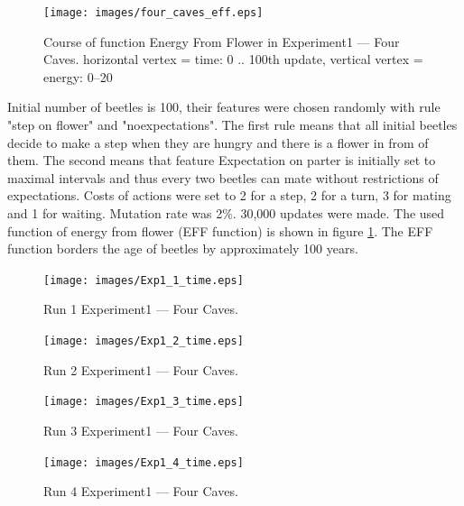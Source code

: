 \documentclass[a4paper,12pt]{report}
\begin{document}
\begin{figure}
\begin{center}
  \texttt{[image: images/four\_caves\_eff.eps]}
  \caption{Course of function Energy From Flower in Experiment1 --- Four Caves. horizontal vertex = time: 0 .. 100th update, vertical vertex = energy: 0--20}
  \label{img.four_caves_eff}
\end{center}
\end{figure}

Initial number of beetles is 100, their features were chosen randomly with rule "step on flower" and "noexpectations". The first rule means that all initial beetles decide to make a step when they are hungry and there is a flower in from of them. The second means that feature Expectation on parter is initially set to maximal intervals and thus every two beetles can mate without restrictions of expectations. Costs of actions were set to 2 for a step, 2 for a turn, 3 for mating and 1 for waiting. Mutation rate was 2\%. 30,000 updates were made. The used function of energy from flower (EFF function) is shown in figure \ref{img.four_caves_eff}. The EFF function borders the age of beetles by approximately 100 years.



\begin{figure}
\begin{center}
  \texttt{[image: images/Exp1\_1\_time.eps]}
  \caption{Run 1 Experiment1 --- Four Caves.}
  \label{img.four_caves_run1_time}
\end{center}
\end{figure}

\begin{figure}
\begin{center}
  \texttt{[image: images/Exp1\_2\_time.eps]}
  \caption{Run 2 Experiment1 --- Four Caves.}
  \label{img.four_caves_run2_time}
\end{center}
\end{figure}

\begin{figure}
\begin{center}
  \texttt{[image: images/Exp1\_3\_time.eps]}
  \caption{Run 3 Experiment1 --- Four Caves.}
  \label{img.four_caves_run3_time}
\end{center}
\end{figure}

\begin{figure}
\begin{center}
  \texttt{[image: images/Exp1\_4\_time.eps]}
  \caption{Run 4 Experiment1 --- Four Caves.}
  \label{img.four_caves_run4_time}
\end{center}
\end{figure}
\end{document}
